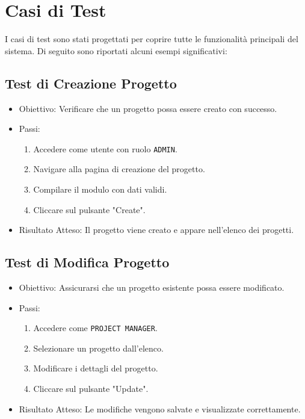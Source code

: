 \documentclass[target=bach,aauheader=,style=]{thud}
\begin{document}
\section{Casi di Test}
I casi di test sono stati progettati per coprire tutte le funzionalità principali del sistema. Di seguito sono riportati alcuni esempi significativi:

\subsection{Test di Creazione Progetto}
\begin{itemize}
    \item Obiettivo: Verificare che un progetto possa essere creato con successo.
    \item Passi:
    \begin{enumerate}
        \item Accedere come utente con ruolo \texttt{ADMIN}.
        \item Navigare alla pagina di creazione del progetto.
        \item Compilare il modulo con dati validi.
        \item Cliccare sul pulsante "Create".
    \end{enumerate}
    \item Risultato Atteso: Il progetto viene creato e appare nell'elenco dei progetti.
\end{itemize}

\subsection{Test di Modifica Progetto}
\begin{itemize}
    \item Obiettivo: Assicurarsi che un progetto esistente possa essere modificato.
    \item Passi:
    \begin{enumerate}
        \item Accedere come \texttt{PROJECT MANAGER}.
        \item Selezionare un progetto dall'elenco.
        \item Modificare i dettagli del progetto.
        \item Cliccare sul pulsante "Update".
    \end{enumerate}
    \item Risultato Atteso: Le modifiche vengono salvate e visualizzate correttamente.
\end{itemize}
\end{document}

